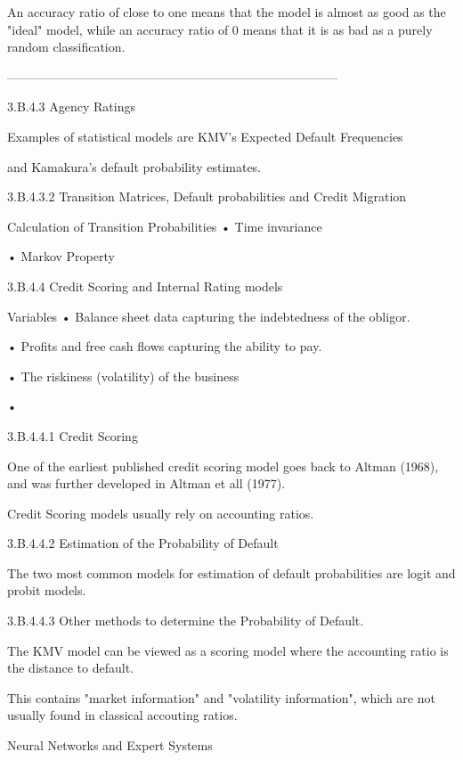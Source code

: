 An accuracy ratio of close to one means that the model is almost as good as the "ideal" model, while an accuracy ratio of 0 means that it is as bad as a purely random classification.


 



--------------------------------------------------------------------------------


3.B.4.3 Agency Ratings

Examples of statistical models are KMV’s Expected Default Frequencies

and Kamakura’s default probability estimates.


3.B.4.3.2 Transition Matrices, Default probabilities and Credit Migration

Calculation of Transition Probabilities
•
Time invariance

•
Markov Property




 

3.B.4.4 Credit Scoring and Internal Rating models

Variables
•
Balance sheet data capturing the indebtedness of the obligor.

•
Profits and free cash flows capturing the ability to pay.

•
The riskiness (volatility) of the business

•



3.B.4.4.1 Credit Scoring

One of the earliest published credit scoring model goes back to Altman (1968), and was further developed in Altman et all (1977).

Credit Scoring models usually rely on accounting ratios.

 

3.B.4.4.2 Estimation of the Probability of Default

The two most common models for estimation of default probabilities are logit and probit models.

 

3.B.4.4.3 Other methods to determine the Probability of Default.

The KMV model can be viewed as a scoring model where the accounting ratio is the distance to default.

This contains "market information" and "volatility information", which are not usually found in classical accouting ratios.


Neural Networks and Expert Systems

